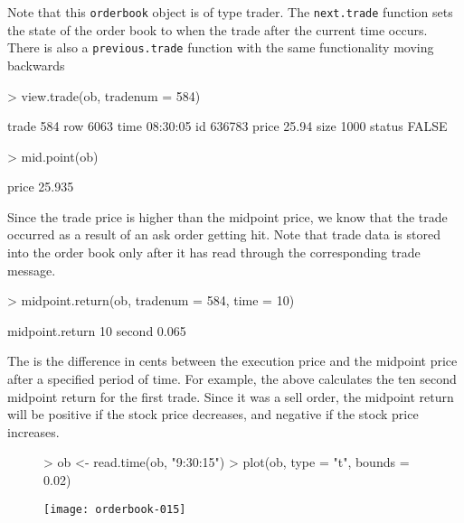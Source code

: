 \documentclass[a4paper]{report}
\begin{document}
\begin{article}
Note that this \texttt{orderbook} object is of type trader.  The
\texttt{next.trade} function sets the state of the order book to when
the trade after the current time occurs. There is also a
\texttt{previous.trade} function with the same functionality moving
backwards

\begin{Schunk}
\begin{Sinput}
> view.trade(ob, tradenum = 584)
\end{Sinput}
\begin{Soutput}
       trade 584
row         6063
time    08:30:05
id        636783
price      25.94
size        1000
status     FALSE
\end{Soutput}
\begin{Sinput}
> mid.point(ob)
\end{Sinput}
\begin{Soutput}
 price 
25.935 
\end{Soutput}
\end{Schunk}

Since the trade price is higher than the midpoint price, we know that
the trade occurred as a result of an ask order getting hit. Note that
trade data is stored into the order book only after it has read
through the corresponding trade message.

\begin{Schunk}
\begin{Sinput}
> midpoint.return(ob, tradenum = 584, time = 10)
\end{Sinput}
\begin{Soutput}
          midpoint.return
10 second           0.065
\end{Soutput}
\end{Schunk}

The  is the difference in cents between the
execution price and the midpoint price after a specified period of
time. For example, the above calculates the ten second midpoint return
for the first trade. Since it was a sell order, the midpoint return
will be positive if the stock price decreases, and negative if the
stock price increases.

\begin{figure}
\centering
\vspace*{.1in}
\begin{Schunk}
\begin{Sinput}
> ob <- read.time(ob, "9:30:15")
> plot(ob, type = "t", bounds = 0.02)
\end{Sinput}
\end{Schunk}
\texttt{[image: orderbook-015]}
\end{figure}


\end{article}
\end{document}
